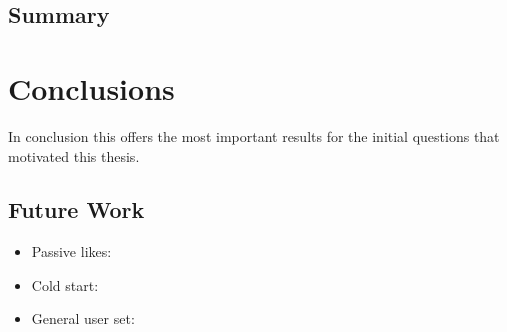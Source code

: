 

\section{Summary}
\label{sec:summary}



\chapter{Conclusions}
\label{cha:conclusions}
In conclusion this offers the most important results for the initial questions that motivated this thesis.

\section{Future Work}
\label{sec:fw}

\begin{itemize}
\item Passive likes: 
\item Cold start: 
\item General user set:
\end{itemize}

